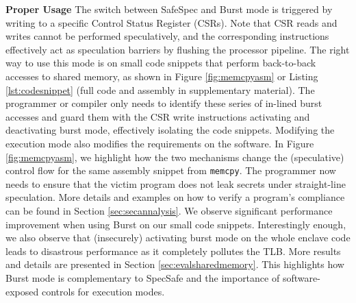 \noindent\textbf{Proper Usage}
The switch between SafeSpec and Burst mode is triggered by writing to a specific Control Status Register (CSRs).
Note that CSR reads and writes cannot be performed speculatively, and the corresponding instructions effectively act as speculation barriers by flushing the processor pipeline.
The right way to use this mode is on small code snippets that perform back-to-back accesses to shared memory, as shown in Figure \ref{fig:memcpyasm} or Listing \ref{lst:codesnippet} (full code and assembly in supplementary material).
The programmer or compiler only needs to identify these series of in-lined burst accesses and guard them with the CSR write instructions activating and deactivating burst mode, effectively isolating the code snippets.
Modifying the execution mode also modifies the requirements on the software.
In Figure \ref{fig:memcpyasm}, we highlight how the two mechanisms change the (speculative) control flow for the same assembly snippet from \texttt{memcpy}.
The programmer now needs to ensure that the victim program does not leak secrets under straight-line speculation.
More details and examples on how to verify a program's compliance can be found in Section \ref{sec:secannalysis}.
We observe significant performance improvement when using Burst on our small code snippets.
Interestingly enough, we also observe that (insecurely) activating burst mode on the whole enclave code leads to disastrous performance as it completely pollutes the TLB.
More results and details are presented in Section \ref{sec:evalsharedmemory}.
This highlights how Burst mode is complementary to SpecSafe and the importance of software-exposed controls for execution modes.